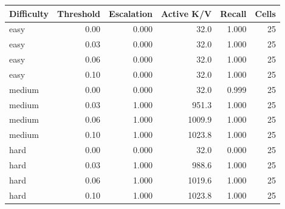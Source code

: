 \begin{tabular}{lrrrrr}
\toprule
Difficulty & Threshold & Escalation & Active K/V & Recall & Cells \\
\midrule
easy & 0.00 & 0.000 & 32.0 & 1.000 & 25 \\
easy & 0.03 & 0.000 & 32.0 & 1.000 & 25 \\
easy & 0.06 & 0.000 & 32.0 & 1.000 & 25 \\
easy & 0.10 & 0.000 & 32.0 & 1.000 & 25 \\
medium & 0.00 & 0.000 & 32.0 & 0.999 & 25 \\
medium & 0.03 & 1.000 & 951.3 & 1.000 & 25 \\
medium & 0.06 & 1.000 & 1009.9 & 1.000 & 25 \\
medium & 0.10 & 1.000 & 1023.8 & 1.000 & 25 \\
hard & 0.00 & 0.000 & 32.0 & 0.000 & 25 \\
hard & 0.03 & 1.000 & 988.6 & 1.000 & 25 \\
hard & 0.06 & 1.000 & 1019.6 & 1.000 & 25 \\
hard & 0.10 & 1.000 & 1023.8 & 1.000 & 25 \\
\bottomrule
\end{tabular}
